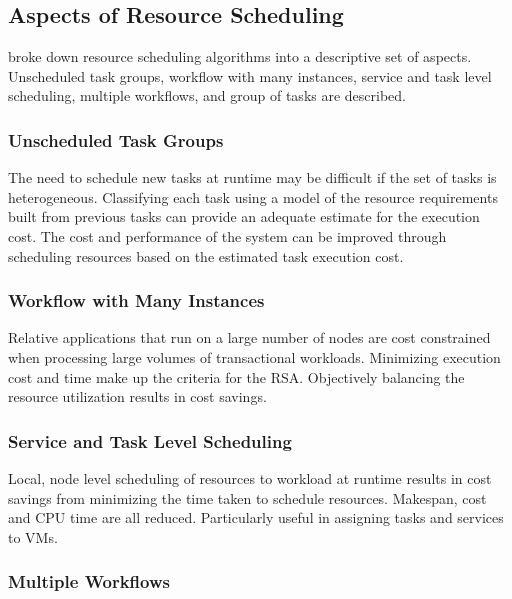 \documentclass[12pt]{article}
\begin{document}

\subsection{Aspects of Resource Scheduling} \label{sub:schedulingaspects}

\textcite{Singh2016} broke down resource scheduling algorithms into a descriptive set of aspects. Unscheduled task groups, workflow with many instances, service and task level scheduling, multiple workflows, and group of tasks are described.



\subsubsection*{Unscheduled Task Groups}

The need to schedule new tasks at runtime may be difficult if the set of tasks is heterogeneous. Classifying each task using a model of the resource requirements built from previous tasks can provide an adequate estimate for the execution cost. The cost and performance of the system can be improved through scheduling resources based on the estimated task execution cost.

\subsubsection*{Workflow with Many Instances}

Relative applications that run on a large number of nodes are cost constrained when processing large volumes of transactional workloads. Minimizing execution cost and time make up the criteria for the RSA. Objectively balancing the resource utilization results in cost savings.

\subsubsection*{Service and Task Level Scheduling}

Local, node level scheduling of resources to workload at runtime results in cost savings from minimizing the time taken to schedule resources. Makespan, cost and CPU time are all reduced. Particularly useful in assigning tasks and services to VMs.

\subsubsection*{Multiple Workflows}
\end{document}
